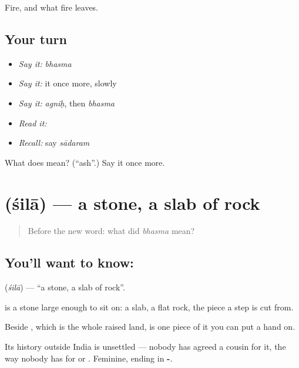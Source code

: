 \begin{grammarlens}[title={What you've built}]
Fire, and what fire leaves.
\end{grammarlens}

\subsection*{Your turn}
\begin{itemize}
\raggedright
  \item \emph{Say it:} \emph{bhasma}
  \item \emph{Say it:} it once more, slowly
  \item \emph{Say it:} \emph{agniḥ}, then \emph{bhasma}
  \item \emph{Read it:} \textbf{}
  \item \emph{Recall:} say \emph{sādaram}
\end{itemize}

\begin{tcolorbox}[breakable,colback=teal!4,colframe=teal!35!black,title={Before you move on}]
What does  mean? (\textquotedblleft{}ash\textquotedblright{}.) Say it once more.
\end{tcolorbox}
\section[\texorpdfstring{\sk{शिला} (śilā)}{शिला (śilā)}]{ (śilā) — a stone, a slab of rock}

\label{lesson:SA-C38-stone}



\begin{quote}
Before the new word: what did \emph{bhasma} mean?
\end{quote}

\subsection*{You'll want to know: }
\textbf{} (\emph{śilā}) — \textquotedblleft{}a stone, a slab of rock\textquotedblright{}.

\textbf{} is a stone large enough to sit on: a slab, a flat rock, the piece a step is cut from.

Beside , which is the whole raised land, \textbf{} is one piece of it you can put a hand on.

Its history outside India is unsettled — nobody has agreed a cousin for it, the way nobody has for  or . Feminine, ending in \textbf{-}.

